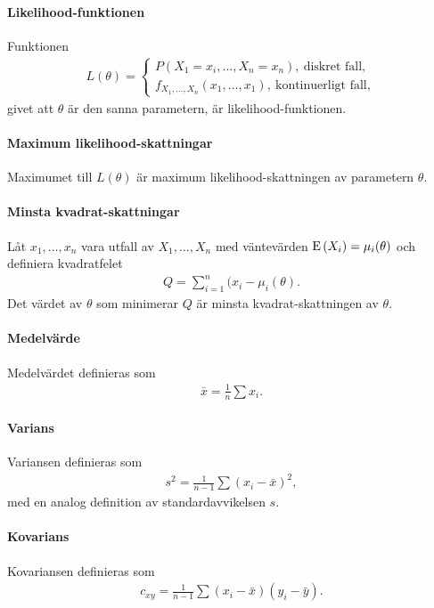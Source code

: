 \paragraph{Likelihood-funktionen}
Funktionen
\begin{align*}
	L(\theta) =
	\begin{cases}
		P(X_1 = x_i, \dots, X_n = x_n),\ \text{diskret fall}, \\
		f_{X_1, \dots, X_n}(x_1, \dots, x_1), \ \text{kontinuerligt fall},
	\end{cases}
\end{align*}
givet att $\theta$ är den sanna parametern, är likelihood-funktionen.

\paragraph{Maximum likelihood-skattningar}
Maximumet till $L(\theta)$ är maximum likelihood-skattningen av parametern $\theta$.

\paragraph{Minsta kvadrat-skattningar}
Låt $x_1, \dots, x_n$ vara utfall av $X_1, \dots, X_n$ med väntevärden $\text{E}\left(X_i\right) = \mu_i(\theta)$ och definiera kvadratfelet
\begin{align*}
	Q = \sum\limits_{i = 1}^{n}(x_i - \mu_i(\theta).
\end{align*}
Det värdet av $\theta$ som minimerar $Q$ är minsta kvadrat-skattningen av $\theta$.

\paragraph{Medelvärde}
Medelvärdet definieras som
\begin{align*}
	\bar{x} = \frac{1}{n}\sum x_i.
\end{align*}

\paragraph{Varians}
Variansen definieras som
\begin{align*}
	s^2 = \frac{1}{n - 1}\sum (x_i - \bar{x})^2,
\end{align*}
med en analog definition av standardavvikelsen $s$.

\paragraph{Kovarians}
Kovariansen definieras som
\begin{align*}
	c_{xy} = \frac{1}{n - 1}\sum (x_i - \bar{x})(y_i - \bar{y}).
\end{align*}

